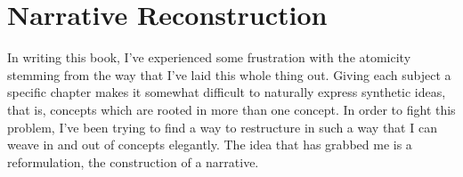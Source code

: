 \documentclass[../butidigress.tex]{subfiles}
\begin{document}
\chapter{Narrative Reconstruction}\label{chap:narrative}
\newpage

In writing this book, I've experienced some frustration with the atomicity stemming from the way that I've laid this whole thing out.
Giving each subject a specific chapter makes it somewhat difficult to naturally express synthetic ideas, that is, concepts which are rooted in more than one concept.
In order to fight this problem, I've been trying to find a way to restructure in such a way that I can weave in and out of concepts elegantly.
The idea that has grabbed me is a reformulation, the construction of a narrative.
\end{document}
